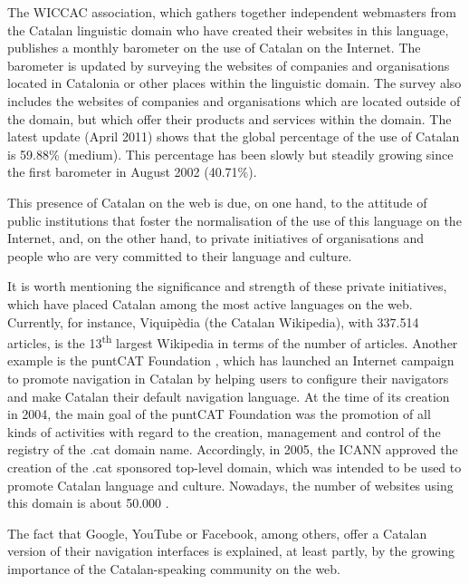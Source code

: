 \documentclass[]{../../metanetpaper}
\begin{document}
\begin{multicols}{2}
The WICCAC \cite{CAT-Nota18} association, which gathers together independent webmasters from the Catalan linguistic domain who have created their websites in this language, publishes a monthly barometer on the use of Catalan on the Internet. The barometer is updated by surveying the websites of companies and organisations located in Catalonia or other places within the linguistic domain. The survey also includes the websites of companies and organisations which are located outside of the domain, but which offer their products and services within the domain. The latest update (April 2011) shows that the global percentage of the use of Catalan is 59.88\% (medium). This percentage has been slowly but steadily growing since the first barometer in August 2002 (40.71\%).

This presence of Catalan on the web is due, on one hand, to the attitude of public institutions that foster the normalisation of the use of this language on the Internet, and, on the other hand, to private initiatives of organisations and people who are very committed to their language and culture.

It is worth mentioning the significance and strength of these private initiatives, which have placed Catalan among the most active languages on the web. Currently, for instance, Viquipèdia (the Catalan Wikipedia), with 337.514 articles, is the 13\textsuperscript{th} largest Wikipedia in terms of the number of articles. Another example is the puntCAT Foundation \cite{CAT-Nota19}, which has launched an Internet campaign to promote navigation in Catalan by helping users to configure their navigators and make Catalan their default navigation language. At the time of its creation in 2004, the main goal of the puntCAT Foundation was the promotion of all kinds of activities with regard to the creation, management and control of the registry of the .cat domain name. Accordingly, in 2005, the ICANN approved the creation of the .cat sponsored top-level domain, which was intended to be used to promote Catalan language and culture. Nowadays, the number of websites using this domain is about 50.000 \cite{CAT-Nota20}.

The fact that Google, YouTube or Facebook, among others, offer a Catalan version of their navigation interfaces is explained, at least partly, by the growing importance of the Catalan-speaking community on the web.


\end{multicols}
\end{document}
